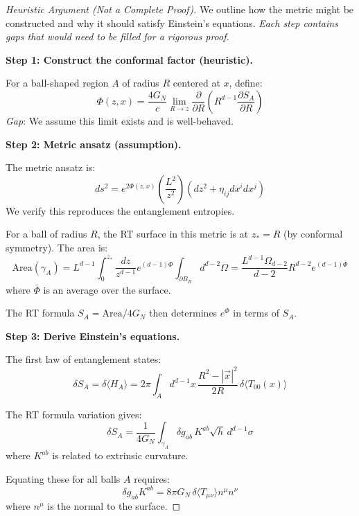 \documentclass[12pt,a4paper]{article}
\begin{document}
\begin{proof}[Heuristic Argument (Not a Complete Proof)]
We outline how the metric might be constructed and why it should satisfy Einstein's equations. \textit{Each step contains gaps that would need to be filled for a rigorous proof.}

\textbf{Step 1: Construct the conformal factor (heuristic).}

For a ball-shaped region $A$ of radius $R$ centered at $x$, define:
\begin{equation}
\Phi(z, x) = \frac{4G_N}{c} \lim_{R \to z} \frac{\partial}{\partial R}\left( R^{d-1} \frac{\partial S_A}{\partial R} \right)
\end{equation}
\textit{Gap}: We assume this limit exists and is well-behaved.

\textbf{Step 2: Metric ansatz (assumption).}

The metric ansatz is:
\begin{equation}
ds^2 = e^{2\Phi(z,x)} \left( \frac{L^2}{z^2} \right) \left( dz^2 + \eta_{ij} dx^i dx^j \right)
\end{equation}
We verify this reproduces the entanglement entropies.

For a ball of radius $R$, the RT surface in this metric is at $z_* = R$ (by conformal symmetry). The area is:
\begin{equation}
\text{Area}(\gamma_A) = L^{d-1} \int_0^{z_*} \frac{dz}{z^{d-1}} e^{(d-1)\Phi} \int_{\partial B_R} d^{d-2}\Omega = \frac{L^{d-1} \Omega_{d-2}}{d-2} R^{d-2} e^{(d-1)\bar{\Phi}}
\end{equation}
where $\bar{\Phi}$ is an average over the surface.

The RT formula $S_A = \text{Area}/4G_N$ then determines $e^{\Phi}$ in terms of $S_A$.

\textbf{Step 3: Derive Einstein's equations.}

The first law of entanglement states:
\begin{equation}
\delta S_A = \delta \langle H_A \rangle = 2\pi \int_A d^{d-1}x \, \frac{R^2 - |\vec{x}|^2}{2R} \, \delta\langle T_{00}(x) \rangle
\end{equation}

The RT formula variation gives:
\begin{equation}
\delta S_A = \frac{1}{4G_N} \int_{\gamma_A} \delta g_{ab} \, K^{ab} \sqrt{h} \, d^{d-1}\sigma
\end{equation}
where $K^{ab}$ is related to extrinsic curvature.

Equating these for all balls $A$ requires:
\begin{equation}
\delta g_{ab} K^{ab} = 8\pi G_N \, \delta\langle T_{\mu\nu} \rangle n^\mu n^\nu
\end{equation}
where $n^\mu$ is the normal to the surface.


\end{proof}
\end{document}
